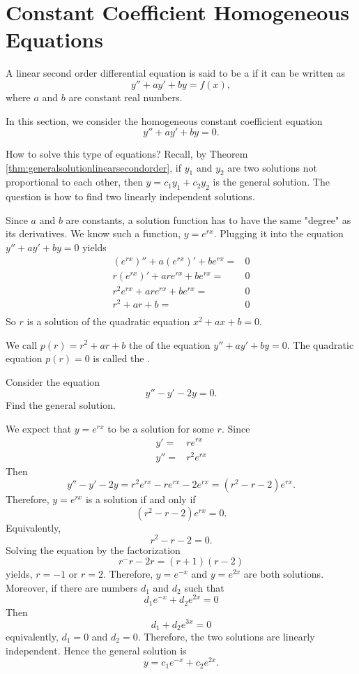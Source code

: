 \section{Constant Coefficient Homogeneous Equations}

A linear second order differential equation is said to be a  if it can be written as
\[y''+ay'+by=f(x),\]
where $a$ and $b$ are constant real numbers.

In this section, we consider the homogeneous constant coefficient equation
\[y''+ay'+by=0.\]

How to solve this type of equations? Recall, by Theorem \ref{thm:generalsolutionlinearsecondorder}, if $y_1$ and $y_2$ are two solutions not proportional to each other, then $y=c_1y_1+c_2y_2$ is the general solution. The question is how to find two linearly independent solutions.

Since $a$ and $b$ are constants, a solution function has to have the same "degree" as its derivatives. We know such a function, $y=e^{rx}$.
Plugging it into the equation $y''+ay'+by=0$ yields
\[
\begin{aligned}
  (e^{rx})''+a(e^{rx})'+be^{rx}=&0\\
  r(e^{rx})'+are^{rx}+be^{rx}=&0\\
  r^2e^{rx}+are^{rx}+be^{rx}=&0\\
  r^2+ar+b=&0\\
\end{aligned}
\]
So $r$ is a solution of the quadratic equation $x^2+ax+b=0$.

We call $p(r)=r^2+ar+b$ the  of the equation $y''+ay'+by=0$. The quadratic equation $p(r)=0$ is called the .

\begin{example}
Consider the equation 
\[  y'' - y' - 2y =0.\]
Find the general solution.
\end{example}
\begin{solution}
We expect that $y= e^{rx}$ to be a solution for some $r$. Since 
\[
\begin{split} 
y' =& r e^{rx} \\
y''=& r^2  e^{rx} 
\end{split}
\]
Then
\[y'' - y' - 2y =  r^2  e^{rx}  - r e^{rx} - 2 e^{rx} = (r^2 - r -2) e^{rx}.\]
Therefore, $y= e^{rx}$ is a solution if and only if 
\[(r^2 - r -2)e^{rx}=0.\]
Equivalently, 
\[r^2 - r -2=0.\]
Solving the equation by the factorization \[r^-r-2r=(r+1)(r-2)\]
yields, $r=-1$ or $r=2$.
Therefore, $y= e^{-x}$ and $y=e^{2x}$
are both solutions. Moreover, if there are numbers $d_1$ and $d_2$ such that
\[d_1e^{-x}+d_2e^{2x}=0\]
Then 
\[d_1+d_2e^{3x}=0\]
equivalently, $d_1=0$ and $d_2=0$. Therefore, the two solutions are linearly independent. Hence the general solution is 
\[y = c_1 e^{-x} + c_2 e^{2x}.\]
\end{solution}

